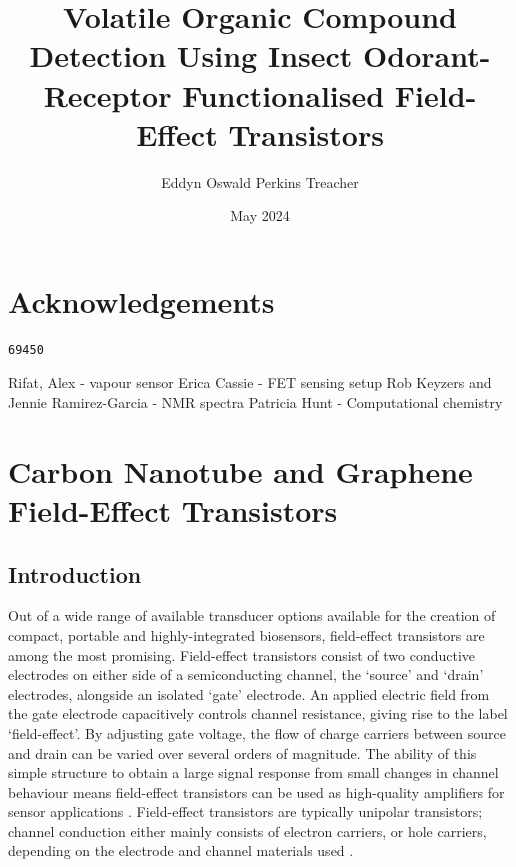 \documentclass[
  a4paper,
]{scrbook}
\title{Volatile Organic Compound Detection Using Insect Odorant-Receptor
Functionalised Field-Effect Transistors}
\author{Eddyn Oswald Perkins Treacher}
\date{May 2024}
\renewcommand*\contentsname{Table of contents}
\newcommand\contentsname{Table of contents}
\begin{document}
\frontmatter
\maketitle
\ifdefined\Shaded\renewenvironment{Shaded}{\begin{tcolorbox}[sharp corners, breakable, borderline west={3pt}{0pt}{shadecolor}, interior hidden, frame hidden, enhanced, boxrule=0pt]}{\end{tcolorbox}}\fi

\renewcommand*\contentsname{Table of contents}
{
\setcounter{tocdepth}{2}
\tableofcontents
}
\mainmatter
{}

\hypertarget{acknowledgements}{%
\chapter*{Acknowledgements}\label{acknowledgements}}


\begin{verbatim}
69450
\end{verbatim}

Rifat, Alex - vapour sensor Erica Cassie - FET sensing setup Rob Keyzers
and Jennie Ramirez-Garcia - NMR spectra Patricia Hunt - Computational
chemistry


\hypertarget{carbon-nanotube-and-graphene-field-effect-transistors}{%
\chapter{Carbon Nanotube and Graphene Field-Effect
Transistors}\label{carbon-nanotube-and-graphene-field-effect-transistors}}

\hypertarget{introduction}{%
\section{Introduction}\label{introduction}}

Out of a wide range of available transducer options available for the
creation of compact, portable and highly-integrated biosensors,
field-effect transistors are among the most promising. Field-effect
transistors consist of two conductive electrodes on either side of a
semiconducting channel, the `source' and `drain' electrodes, alongside
an isolated `gate' electrode. An applied electric field from the gate
electrode capacitively controls channel resistance, giving rise to the
label `field-effect'. By adjusting gate voltage, the flow of charge
carriers between source and drain can be varied over several orders of
magnitude. The ability of this simple structure to obtain a large signal
response from small changes in channel behaviour means field-effect
transistors can be used as high-quality amplifiers for sensor
applications \autocite{Shkodra2021,Yao2021}. Field-effect transistors
are typically unipolar transistors; channel conduction either mainly
consists of electron carriers, or hole carriers, depending on the
electrode and channel materials used \autocite{Yao2021}.
\end{document}
